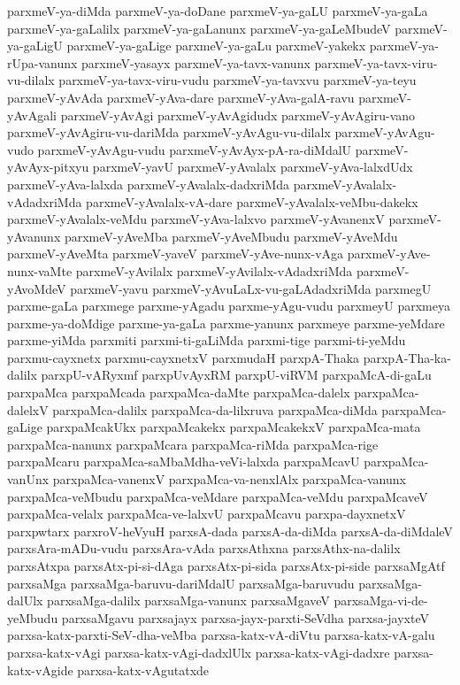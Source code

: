 {parxmeV-ya-diMda
parxmeV-ya-doDane
parxmeV-ya-gaLU
parxmeV-ya-gaLa
parxmeV-ya-gaLalilx
parxmeV-ya-gaLanunx
parxmeV-ya-gaLeMbudeV
parxmeV-ya-gaLigU
parxmeV-ya-gaLige
parxmeV-ya-gaLu
parxmeV-yakekx
parxmeV-ya-rUpa-vanunx
parxmeV-yasayx
parxmeV-ya-tavx-vanunx
parxmeV-ya-tavx-viru-vu-dilalx
parxmeV-ya-tavx-viru-vudu
parxmeV-ya-tavxvu
parxmeV-ya-teyu
parxmeV-yAvAda
parxmeV-yAva-dare
parxmeV-yAva-galA-ravu
parxmeV-yAvAgali
parxmeV-yAvAgi
parxmeV-yAvAgidudx
parxmeV-yAvAgiru-vano
parxmeV-yAvAgiru-vu-dariMda
parxmeV-yAvAgu-vu-dilalx
parxmeV-yAvAgu-vudo
parxmeV-yAvAgu-vudu
parxmeV-yAvAyx-pA-ra-diMdalU
parxmeV-yAvAyx-pitxyu
parxmeV-yavU
parxmeV-yAvalalx
parxmeV-yAva-lalxdUdx
parxmeV-yAva-lalxda
parxmeV-yAvalalx-dadxriMda
parxmeV-yAvalalx-vAdadxriMda
parxmeV-yAvalalx-vA-dare
parxmeV-yAvalalx-veMbu-dakekx
parxmeV-yAvalalx-veMdu
parxmeV-yAva-lalxvo
parxmeV-yAvanenxV
parxmeV-yAvanunx
parxmeV-yAveMba
parxmeV-yAveMbudu
parxmeV-yAveMdu
parxmeV-yAveMta
parxmeV-yaveV
parxmeV-yAve-nunx-vAga
parxmeV-yAve-nunx-vaMte
parxmeV-yAvilalx
parxmeV-yAvilalx-vAdadxriMda
parxmeV-yAvoMdeV
parxmeV-yavu
parxmeV-yAvuLaLx-vu-gaLAdadxriMda
parxmegU
parxme-gaLa
parxmege
parxme-yAgadu
parxme-yAgu-vudu
parxmeyU
parxmeya
parxme-ya-doMdige
parxme-ya-gaLa
parxme-yanunx
parxmeye
parxme-yeMdare
parxme-yiMda
parxmiti
parxmi-ti-gaLiMda
parxmi-tige
parxmi-ti-yeMdu
parxmu-cayxnetx
parxmu-cayxnetxV
parxmudaH
parxpA-Thaka
parxpA-Tha-ka-dalilx
parxpU-vARyxmf
parxpUvAyxRM
parxpU-viRVM
parxpaMcA-di-gaLu
parxpaMca
parxpaMcada
parxpaMca-daMte
parxpaMca-dalelx
parxpaMca-dalelxV
parxpaMca-dalilx
parxpaMca-da-lilxruva
parxpaMca-diMda
parxpaMca-gaLige
parxpaMcakUkx
parxpaMcakekx
parxpaMcakekxV
parxpaMca-mata
parxpaMca-nanunx
parxpaMcara
parxpaMca-riMda
parxpaMca-rige
parxpaMcaru
parxpaMca-saMbaMdha-veVi-lalxda
parxpaMcavU
parxpaMca-vanUnx
parxpaMca-vanenxV
parxpaMca-va-nenxlAlx
parxpaMca-vanunx
parxpaMca-veMbudu
parxpaMca-veMdare
parxpaMca-veMdu
parxpaMcaveV
parxpaMca-velalx
parxpaMca-ve-lalxvU
parxpaMcavu
parxpa-dayxnetxV
parxpwtarx
parxroV-heVyuH
parxsA-dada
parxsA-da-diMda
parxsA-da-diMdaleV
parxsAra-mADu-vudu
parxsAra-vAda
parxsAthxna
parxsAthx-na-dalilx
parxsAtxpa
parxsAtx-pi-si-dAga
parxsAtx-pi-sida
parxsAtx-pi-side
parxsaMgAtf
parxsaMga
parxsaMga-baruvu-dariMdalU
parxsaMga-baruvudu
parxsaMga-dalUlx
parxsaMga-dalilx
parxsaMga-vanunx
parxsaMgaveV
parxsaMga-vi-de-yeMbudu
parxsaMgavu
parxsajayx
parxsa-jayx-parxti-SeVdha
parxsa-jayxteV
parxsa-katx-parxti-SeV-dha-veMba
parxsa-katx-vA-diVtu
parxsa-katx-vA-galu
parxsa-katx-vAgi
parxsa-katx-vAgi-dadxlUlx
parxsa-katx-vAgi-dadxre
parxsa-katx-vAgide
parxsa-katx-vAgutatxde
}

